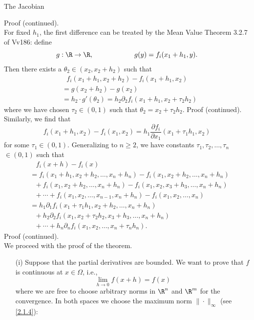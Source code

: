 \documentclass[smaller,hyperref={CJKbookmarks=true}]{beamer}
\newcommand{\myseries}[2]{$#1_1,#1_2,\dots,#1_#2$}
\begin{document}
\begin{frame}{The Jacobian}
\begin{spacing}{1}
\newpage
\vspace*{14pt}
\alert{Proof (continued).}\\[5pt]
For fixed $h_1$, the first dif{}ference can be treated by the Mean Value Theorem 3.2.7 of Vv186: define
\[g:\R\to\R,\qquad\qquad\qquad g(y)=f_i(x_1+h_1,y).\]
Then there exists a $\theta_2\in(x_2,x_2+h_2)$ such that
\begin{equation*}
  \begin{split}
       &~~~f_i(x_1+h_1,x_2+h_2)-f_i(x_1+h_1,x_2) \\
       &=g(x_2+h_2)-g(x_2)  \\
       &=h_2\cdot g'(\theta_2)=h_2\partial_2f_i(x_1+h_1,x_2+\tau_2h_2)
  \end{split}
\end{equation*}
where we have chosen $\tau_2\in(0,1)$ such that $\theta_2=x_2+\tau_2h_2$.
\newpage
\alert{Proof (continued).}\\
Similarly, we find that
\[f_i(x_1+h_1,x_2)-f_i(x_1,x_2)=h_1\frac{\partial f_i}{\partial x_1}(x_1+\tau_1h_1,x_2)\]
for some $\tau_1\in(0,1)$. Generalizing to $n\geq2$, we have constants \myseries{\tau}{n}$\in(0,1)$ such that
\begin{equation*}
  \begin{split}
       &~~~~f_i(x+h)-f_i(x)  \\
       &=f_i(x_1+h_1,x_2+h_2,\ldots,x_n+h_n)-f_i(x_1,x_2+h_2,
       \ldots,x_n+h_n)  \\
       &~~~+f_i(x_1,x_2+h_2,\ldots,x_n+h_n)-f_i(x_1,x_2,x_3+h_3,\ldots,x_n+h_n)  \\
       &~~~+\cdots+f_i(x_1,x_2,\ldots,x_{n-1},x_n+h_n)-f_i(x_1,x_2,\ldots,x_n)  \\
       &=h_1\partial_1f_i(x_1+\tau_1h_1,x_2+h_2,\ldots,x_n+h_n)  \\
       &~~~+h_2\partial_2f_i(x_1,x_2+\tau_2h_2,x_3+h_3,\ldots,x_n+h_n)  \\
       &~~~+\cdots+h_n\partial_nf_i(x_1,x_2,\ldots,x_n+\tau_nh_n).
  \end{split}
\end{equation*}
\newpage
\alert{Proof (continued).}\\
We proceed with the proof of the theorem.
\begin{itemize}
  \item[(i)] Suppose that the partial derivatives are bounded. We want to prove that $f$ is continuous at $x\in\Omega$, i.e.,
      \[\lim_{h\to0}f(x+h)=f(x)\]
      where we are free to choose arbitrary norms in $\R^n$ and $\R^m$ for the convergence. In both spaces we choose the maximum norm $\|\cdot\|_{\infty}$ (see \eqref{2.1.4}):

\end{itemize}
\end{spacing}
\end{frame}
\end{document}
